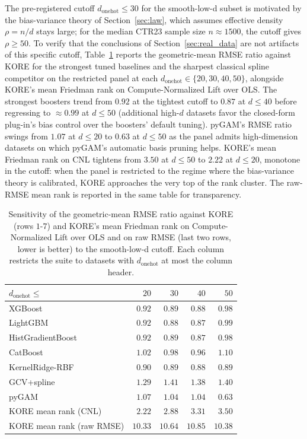 \documentclass{article}
\newcommand{\KORE}{\textsc{KORE}}
\begin{document}
The pre-registered cutoff $d_{\mathrm{onehot}} \le 30$ for the smooth-low-d subset is motivated by the bias-variance theory of Section~\ref{sec:law}, which assumes effective density $\rho = n / d$ stays large; for the median CTR23 sample size $n \approx 1500$, the cutoff gives $\rho \ge 50$. To verify that the conclusions of Section~\ref{sec:real_data} are not artifacts of this specific cutoff, Table~\ref{tab:threshold_sensitivity} reports the geometric-mean RMSE ratio against \KORE{} for the strongest tuned baselines and the sharpest classical spline competitor on the restricted panel at each $d_{\mathrm{onehot}} \in \{20, 30, 40, 50\}$, alongside \KORE{}'s mean Friedman rank on Compute-Normalized Lift over OLS. The strongest boosters trend from $0.92$ at the tightest cutoff to $0.87$ at $d \le 40$ before regressing to $\approx 0.99$ at $d \le 50$ (additional high-$d$ datasets favor the closed-form plug-in's bias control over the boosters' default tuning). pyGAM's RMSE ratio swings from $1.07$ at $d \le 20$ to $0.63$ at $d \le 50$ as the panel admits high-dimension datasets on which pyGAM's automatic basis pruning helps. \KORE{}'s mean Friedman rank on CNL tightens from $3.50$ at $d \le 50$ to $2.22$ at $d \le 20$, monotone in the cutoff: when the panel is restricted to the regime where the bias-variance theory is calibrated, \KORE{} approaches the very top of the rank cluster. The raw-RMSE mean rank is reported in the same table for transparency.

\begin{table}[h]
\centering
\small
\begin{tabular}{lrrrr}
\toprule
$d_{\mathrm{onehot}} \le$ & $20$ & $30$ & $40$ & $50$ \\
\midrule
XGBoost              & $0.92$ & $0.89$ & $0.88$ & $0.98$ \\
LightGBM             & $0.92$ & $0.88$ & $0.87$ & $0.99$ \\
HistGradientBoost    & $0.92$ & $0.89$ & $0.87$ & $0.98$ \\
CatBoost             & $1.02$ & $0.98$ & $0.96$ & $1.10$ \\
KernelRidge-RBF      & $0.90$ & $0.89$ & $0.88$ & $0.89$ \\
GCV+spline           & $1.29$ & $1.41$ & $1.38$ & $1.40$ \\
pyGAM                & $1.07$ & $1.04$ & $1.04$ & $0.63$ \\
\midrule
\KORE{} mean rank (CNL)      & $2.22$ & $2.88$ & $3.31$ & $3.50$ \\
\KORE{} mean rank (raw RMSE) & $10.33$ & $10.64$ & $10.85$ & $10.38$ \\
\bottomrule
\end{tabular}
\caption{Sensitivity of the geometric-mean RMSE ratio against \KORE{} (rows $1$-$7$) and \KORE{}'s mean Friedman rank on Compute-Normalized Lift over OLS and on raw RMSE (last two rows, lower is better) to the smooth-low-d cutoff. Each column restricts the suite to datasets with $d_{\mathrm{onehot}}$ at most the column header.}
\label{tab:threshold_sensitivity}
\end{table}
\end{document}
